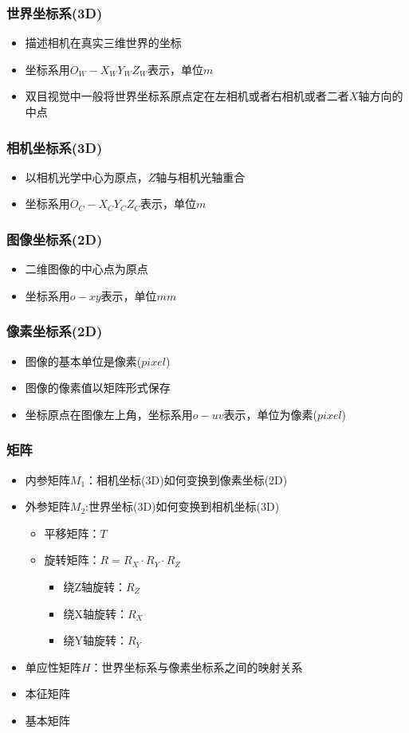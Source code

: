 \documentclass[aspectratio=43]{beamer}
\begin{document}
\begin{frame}
\frametitle{世界坐标系(3D)}
\begin{itemize}
	\item 描述相机在真实三维世界的坐标
	\item 坐标系用$O_{W} -X_{W} Y_{W} Z_{W} $表示，单位$m$
	\item 双目视觉中一般将世界坐标系原点定在左相机或者右相机或者二者$X$轴方向的中点
\end{itemize}
\end{frame}

\begin{frame}
		\frametitle{相机坐标系(3D)}
\begin{itemize}
	\item 以相机光学中心为原点，$Z$轴与相机光轴重合
	\item 坐标系用$O_{C} -X_{C} Y_{C} Z_{C} $表示，单位$m$
\end{itemize}
\end{frame}

\begin{frame}
		\frametitle{图像坐标系(2D)}
\begin{itemize}
	\item 二维图像的中心点为原点
	\item 坐标系用$o-xy$表示，单位$mm$
\end{itemize}		
\end{frame}

\begin{frame}
\frametitle{像素坐标系(2D)}
\begin{itemize}
	\item 图像的基本单位是像素($pixel$)
	\item 图像的像素值以矩阵形式保存
	\item 坐标原点在图像左上角，坐标系用$o-uv $表示，单位为像素($pixel$)
\end{itemize}
\end{frame}

\begin{frame}
	\frametitle{矩阵}
	\begin{itemize}
		\item 内参矩阵$M_1$：相机坐标(3D)如何变换到像素坐标(2D)
		\item 外参矩阵$M_2$:世界坐标(3D)如何变换到相机坐标(3D)
		\begin{itemize}
			\item 平移矩阵：$T$
			\item 旋转矩阵：$R=R_X\cdot R_Y\cdot R_Z$
			\begin{itemize}
				\item 绕Z轴旋转：$R_Z$
				\item 绕X轴旋转：$R_X$
				\item 绕Y轴旋转：$R_Y$
			\end{itemize}
		\end{itemize}
		\item 单应性矩阵$H$：世界坐标系与像素坐标系之间的映射关系
		\item 本征矩阵
		\item 基本矩阵
	\end{itemize}
\end{frame}
\end{document}
